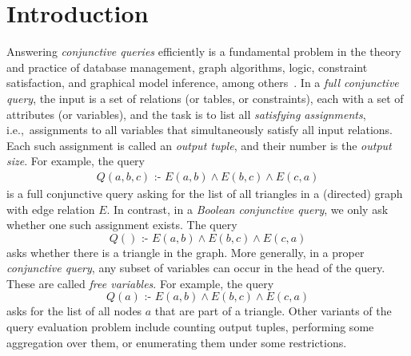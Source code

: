 \documentclass[10pt,a4paper]{article}
\newcommand{\cd}{\text{ :- }}
\begin{document}
\section{Introduction}
Answering {\em conjunctive queries} efficiently is a fundamental problem in the theory and
practice of database management, graph algorithms, logic, constraint satisfaction, and
graphical model inference, among
others~\cite{DBLP:conf/pods/KhamisNR16,DBLP:conf/pods/GottlobGLS16,DBLP:journals/talg/GroheM14,DBLP:books/aw/AbiteboulHV95}.
In a {\em full conjunctive query}, the input is a set of relations (or tables, or
constraints), each with a set of attributes (or variables), and the task is to list all {\em
satisfying assignments}, i.e.,~assignments to all variables that simultaneously satisfy all
input relations.  Each such assignment is called an {\em output tuple}, and their number is
the {\em output size}. For example, the query
\begin{align}
Q(a,b,c) \cd E(a,b) \wedge E(b,c) \wedge E(c,a) \label{eqn:triangle}
\end{align}
is a full conjunctive query asking for the list of all triangles in a (directed) graph with
edge relation $E$.
In contrast, in a {\em Boolean conjunctive query}, we only ask whether one such
assignment exists. The query
\[ Q() \cd E(a,b) \wedge E(b,c) \wedge E(c,a) \]
asks whether there is a triangle in the graph.
More generally, in a proper {\em conjunctive query}, any subset of variables can occur in
the head of the query. These are called {\em free variables}. For example, the query
\[ Q(a) \cd E(a,b) \wedge E(b,c) \wedge E(c,a) \]
asks for the list of all nodes $a$ that are part of a triangle.
Other variants of the query evaluation problem include counting output
tuples, performing some aggregation over them, or enumerating them under some restrictions.
\end{document}
